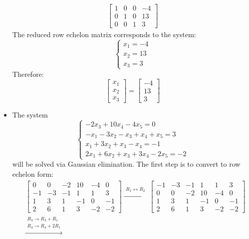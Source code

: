 \documentclass{article}
\begin{document}
\begin{itemize}
\begin{align*}
\left[\begin{array}{ccc|c}
1 & 0 & 0 & -4 \\
0 & 1 & 0 & 13 \\
0 & 0 & 1 & 3 
\end{array}\right]
\end{align*}
The reduced row echelon matrix corresponds to the system:
\[\left\{\begin{array}{c}
x_1 = -4 \\
x_2 = 13 \\
x_3 = 3
\end{array}\right.\]
Therefore:
\[\begin{bmatrix} x_1 \\ x_2 \\ x_3 \end{bmatrix} = \begin{bmatrix} -4 \\ 13 \\ 3 \end{bmatrix}\]
\item 
The system
\[\left\{\begin{array}{c}
-2x_3 + 10x_4 - 4x_5 = 0 \\
-x_1 - 3x_2 - x_3 + x_4 + x_5 = 3 \\
x_1 + 3x_2 + x_3 - x_4 = -1 \\
2x_1 + 6x_2 + x_3 + 3x_4 - 2x_5 = -2
\end{array}\right.\]
will be solved via Gaussian elimination. The first step is to convert to row echelon form:  
\begin{align*}
& \left[\begin{array}{ccccc|c}
 0 &  0 & -2 & 10 & -4 &  0 \\
-1 & -3 & -1 &  1 &  1 &  3 \\
 1 &  3 &  1 & -1 &  0 & -1 \\
 2 &  6 &  1 &  3 & -2 & -2
\end{array}\right]
\xrightarrow{\begin{array}{c} R_1 \leftrightarrow R_2 \end{array}}
\left[\begin{array}{ccccc|c}
-1 & -3 & -1 &  1 &  1 &  3 \\
 0 &  0 & -2 & 10 & -4 &  0 \\
 1 &  3 &  1 & -1 &  0 & -1 \\
 2 &  6 &  1 &  3 & -2 & -2
\end{array}\right] \\ 
& \xrightarrow{\begin{array}{c} R_3 \rightarrow R_3 + R_1 \\ R_4 \rightarrow R_4 + 2R_1 \end{array}}

\end{align*}
\end{itemize}
\end{document}

